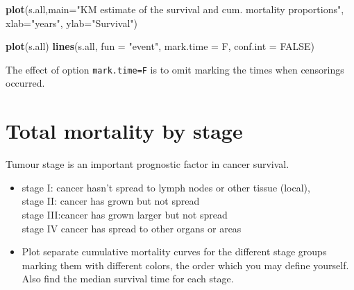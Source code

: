 \documentclass[
]{book}
\newenvironment{Shaded}{\begin{snugshade}}{\end{snugshade}}
\newcommand{\AttributeTok}[1]{\textcolor[rgb]{0.13,0.29,0.53}{#1}}
\newcommand{\ConstantTok}[1]{\textcolor[rgb]{0.56,0.35,0.01}{#1}}
\newcommand{\FunctionTok}[1]{\textcolor[rgb]{0.13,0.29,0.53}{\textbf{#1}}}
\newcommand{\NormalTok}[1]{#1}
\newcommand{\StringTok}[1]{\textcolor[rgb]{0.31,0.60,0.02}{#1}}
\begin{document}
\begin{Shaded}
\begin{Highlighting}[]
\FunctionTok{plot}\NormalTok{(s.all,}\AttributeTok{main=}\StringTok{"KM estimate of the survival}
\StringTok{     and cum. mortality proportions"}\NormalTok{,}
     \AttributeTok{xlab=}\StringTok{"years"}\NormalTok{, }\AttributeTok{ylab=}\StringTok{"Survival"}\NormalTok{)}
\end{Highlighting}
\end{Shaded}

\begin{Shaded}
\begin{Highlighting}[]
\FunctionTok{plot}\NormalTok{(s.all)}
\FunctionTok{lines}\NormalTok{(s.all, }\AttributeTok{fun =} \StringTok{"event"}\NormalTok{, }\AttributeTok{mark.time =}\NormalTok{ F, }\AttributeTok{conf.int =} \ConstantTok{FALSE}\NormalTok{)}
\end{Highlighting}
\end{Shaded}

The effect of option \texttt{mark.time=F} is to omit
marking the times when censorings occurred.

\section{Total mortality by stage}\label{total-mortality-by-stage}

Tumour stage is an important prognostic factor in cancer survival.

\begin{itemize}
\item
  stage I: cancer hasn't spread to lymph nodes or other tissue (local),\\
  stage II: cancer has grown but not spread\\
  stage III:cancer has grown larger but not spread\\
  stage IV cancer has spread to other organs or areas
\item
  Plot separate cumulative mortality curves for the different stage groups
  marking them with different colors, the order which you may define yourself.
  Also find the median survival time for each stage.
\end{itemize}
\end{document}

